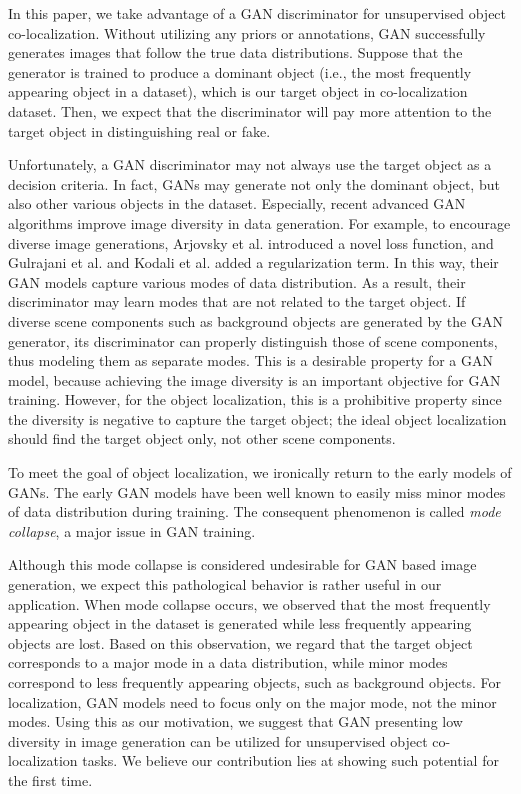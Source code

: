\documentclass[runningheads]{llncs}
\begin{document}
In this paper, we take advantage of a GAN discriminator for unsupervised object co-localization. Without utilizing any priors or annotations, GAN successfully generates images that follow the true data distributions. Suppose that the generator is trained to produce a dominant object (i.e., the most frequently appearing object in a dataset), which is our target object in co-localization dataset. Then, we expect that the discriminator will pay more attention to the target object in distinguishing real or fake.

Unfortunately, a GAN discriminator may not always use the target object as a decision criteria. In fact, GANs may generate not only the dominant object, but also other various objects in the dataset. Especially, recent advanced GAN algorithms improve image diversity in data generation. For example, to encourage diverse image generations, Arjovsky et al. \cite{arjovsky2017wasserstein} introduced a novel loss function, and Gulrajani et al. and Kodali et al. \cite{gulrajani2017improved,kodali2017dragan} added a regularization term. In this way, their GAN models capture various modes of data distribution. As a result, their discriminator may learn modes that are not related to the target object. If diverse scene components such as background objects are generated by the GAN generator, its discriminator can properly distinguish those of scene components, thus modeling them as separate modes. This is a desirable property for a GAN model, because achieving the image diversity is an important objective for GAN training. However, for the object localization, this is a prohibitive property since the diversity is negative to capture the target object; the ideal object localization should find the target object only, not other scene components.  

To meet the goal of object localization, we ironically return to the early models of GANs. The early GAN models have been well known to easily miss minor modes of data distribution during training. The consequent phenomenon is called \emph{mode collapse}, a major issue in GAN training.

Although this mode collapse is considered undesirable for GAN based image generation, we expect this pathological behavior is rather useful in our application. When mode collapse occurs, we observed that the most frequently appearing object in the dataset is generated while less frequently appearing objects are lost. Based on this observation, we regard that the target object corresponds to a major mode in a data distribution, while minor modes correspond to less frequently appearing objects, such as background objects. For localization, GAN models need to focus only on the major mode, not the minor modes. Using this as our motivation, we suggest that GAN presenting low diversity in image generation can be utilized for unsupervised object co-localization tasks. We believe our contribution lies at showing such potential for the first time. 
\end{document}
